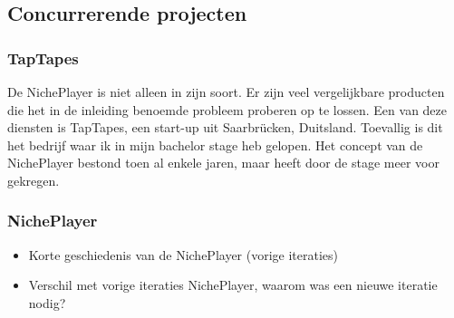 \subsection{Concurrerende projecten}
\subsubsection*{TapTapes}
De NichePlayer is niet alleen in zijn soort. Er zijn veel vergelijkbare producten die het in de inleiding benoemde probleem proberen op te lossen. Een van deze diensten is TapTapes, een start-up uit Saarbrücken, Duitsland. Toevallig is dit het bedrijf waar ik in mijn bachelor stage heb gelopen. Het concept van de NichePlayer bestond toen al enkele jaren, maar heeft door de stage meer voor gekregen.

\subsubsection*{NichePlayer}
\begin{itemize}
    \item Korte geschiedenis van de NichePlayer (vorige iteraties)
    \item Verschil met vorige iteraties NichePlayer, waarom was een nieuwe iteratie nodig?
\end{itemize}
